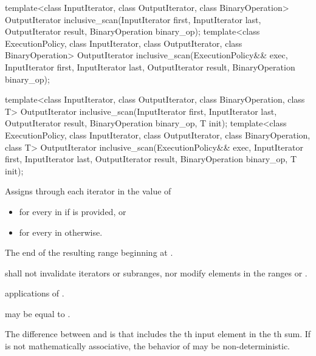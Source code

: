 %
\begin{itemdecl}
template<class InputIterator, class OutputIterator, class BinaryOperation>
  OutputIterator inclusive_scan(InputIterator first, InputIterator last,
                                OutputIterator result,
                                BinaryOperation binary_op);
template<class ExecutionPolicy, class InputIterator, class OutputIterator, class BinaryOperation>
  OutputIterator inclusive_scan(ExecutionPolicy&& exec,
                                InputIterator first, InputIterator last,
                                OutputIterator result,
                                BinaryOperation binary_op);

template<class InputIterator, class OutputIterator, class BinaryOperation, class T>
  OutputIterator inclusive_scan(InputIterator first, InputIterator last,
                                OutputIterator result,
                                BinaryOperation binary_op, T init);
template<class ExecutionPolicy, class InputIterator, class OutputIterator, class BinaryOperation, class T>
  OutputIterator inclusive_scan(ExecutionPolicy&& exec,
                                InputIterator first, InputIterator last,
                                OutputIterator result,
                                BinaryOperation binary_op, T init);
\end{itemdecl}

\begin{itemdescr}
\pnum
\effects
Assigns through each iterator  in  the value of
\begin{itemize}
\item
{}
for every  in 
if  is provided, or
\item
{}
for every  in  otherwise.
\end{itemize}

\pnum
\returns
The end of the resulting range beginning at .

\pnum
\requires
{} shall not invalidate iterators or subranges, nor modify
elements in the ranges  or .

\pnum
\complexity
{} applications of .

\pnum
\remarks
{} may be equal to .

\pnum
\realnotes
The difference between  and  is
that  includes the th input element in the
th sum.  If  is not mathematically associative, the
behavior of  may be non-deterministic.
\end{itemdescr}


